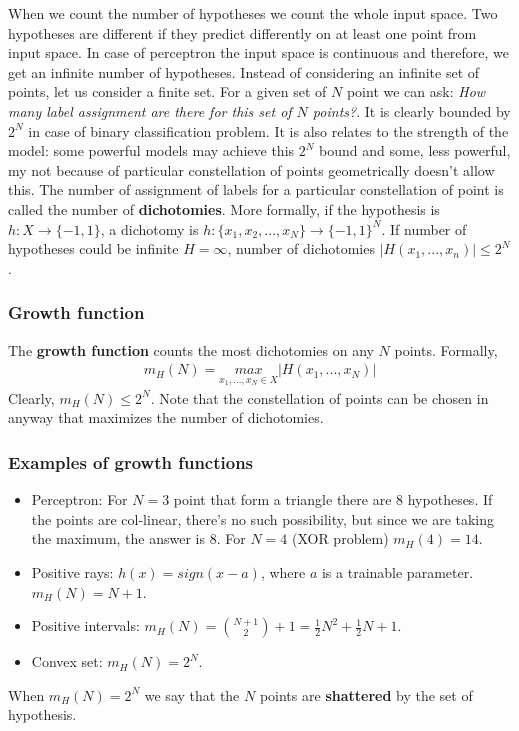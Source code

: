 \documentclass[class=article, crop=false]{standalone}
\numberwithin{equation}{section}
\begin{document}
When we count the number of hypotheses we count the whole input space. Two hypotheses are different if they predict differently on at least one point from input space. In case of perceptron the input space is continuous and therefore, we get an infinite number of hypotheses. Instead of considering an infinite set of points, let us consider a finite set. For a given set of $N$ point we can ask: \textit{How many label assignment are there for this set of $N$ points?}. It is clearly bounded by $2^N$ in case of binary classification problem. It is also relates to the strength of the model: some powerful models may achieve this $2^N$ bound and some, less powerful, my not because of particular constellation of points geometrically doesn't allow this. The number of assignment of labels for a particular constellation of point is called the number of \textbf{dichotomies}. More formally, if the hypothesis is $h:X\rightarrow \{ -1, 1 \}$, a dichotomy is $h: \{ x_1, x_2, ..., x_N \}\rightarrow \{ -1, 1 \}^N$. If number of hypotheses could be infinite $H=\infty$, number of dichotomies $|H(x_1, ..., x_n)|\leq 2^N$.


\subsubsection{Growth function}
The \textbf{growth function} counts the most dichotomies on any $N$ points. Formally,
\begin{align}
    m_H(N) = \underset{x_1, ..., x_N\in X}{max}|H(x_1, ..., x_N)|
\end{align}
Clearly, $m_H(N)\leq 2^N$. Note that the constellation of points can be chosen in anyway that maximizes the number of dichotomies. 

\subsubsection*{Examples of growth functions}
\begin{itemize}
    \item Perceptron: For $N=3$ point that form a triangle there are $8$ hypotheses. If the points are col-linear, there's no such possibility, but since we are taking the maximum, the answer is $8$. For $N=4$ (XOR problem) $m_H(4)=14$. 
    \item Positive rays: $h(x)=sign(x-a)$, where $a$ is a trainable parameter. $m_H(N)=N+1$.
    \item Positive intervals: $m_H(N)={N+1 \choose 2} + 1=\frac{1}{2}N^2+\frac{1}{2}N+1$.
    \item Convex set: $m_H(N)=2^N$.
\end{itemize}
When $m_H(N)=2^N$ we say that the $N$ points are \textbf{shattered} by the set of hypothesis.
\end{document}
